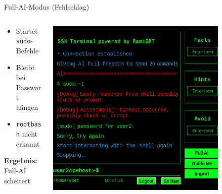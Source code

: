 \documentclass[
	aspectratio=169,	%
	onlytextwidth,		%
	t,					%
	]{beamer}
\begin{document}
\begin{frame}{Full-AI-Modus (Fehlschlag)}
	\begin{columns}
		\begin{column}[T]{.45\textwidth}
			\begin{itemize}
				\item Startet \texttt{sudo}-Befehle
				\item Bleibt bei Passwort hängen
				\item \texttt{rootbash} nicht erkannt
			\end{itemize}
			\vspace{2mm}
			\textbf{Ergebnis:} Full-AI scheitert
		\end{column}
	\begin{column}[T]{.55\textwidth}
		\centering
		\vspace{-7mm}
		\includegraphics[width=0.8\textwidth]{figures/6.png}
		\label{fig:6}
		\end{column}
	\end{columns}
\end{frame}
\end{document}
